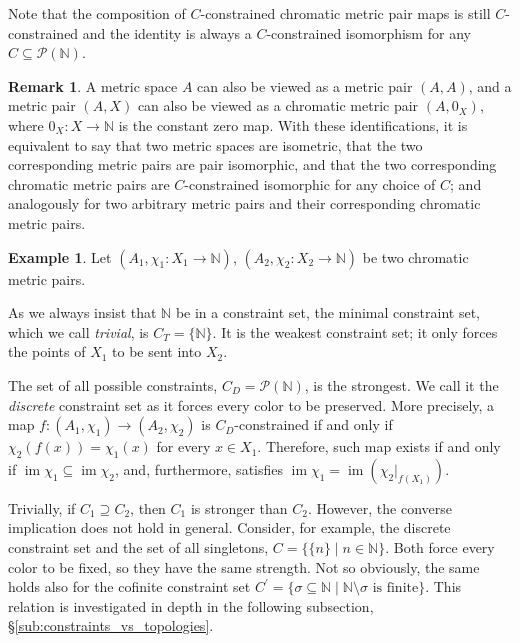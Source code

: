 \documentclass[8pt,a4paper,oneside,english,english]{article}
\theoremstyle{plain}
\theoremstyle
{plain}
\theoremstyle{definition}
\newtheorem{example}[theorem]{Example}%
\newtheorem{remark}[theorem]{Remark}%
\newcommand{\N}{\mathbb{N}}
\newcommand{\MP}[1]{(A_{#1},\chi_{#1})}
\newcommand{\extMP}[1]{(A_{#1},\chi_{#1}\colon X_{#1}\to\N)}
\DeclareMathOperator{\im}{im}
\begin{document}
Note that the composition of $C$-constrained chromatic metric pair maps is still $C$-constrained and the identity is always a $C$-constrained isomorphism for any $C\subseteq \mathcal{P}(\N)$.



\begin{remark}\label{rem:from_metric_to_chromatic_metric_pairs}
    A metric space $A$ can also be viewed as a metric pair $(A,A)$, and a metric pair $(A,X)$ can also be viewed as a chromatic metric pair $(A, 0_X)$, where $0_X\colon X\rightarrow\N$ is the constant zero map. 
    With these identifications, it is equivalent to say that two metric spaces are isometric, that the two corresponding metric pairs are pair isomorphic, and that the two corresponding chromatic metric pairs are $C$-constrained isomorphic for any choice of $C$; and analogously for two arbitrary metric pairs and their corresponding chromatic metric pairs.
\end{remark}

\begin{example}\label{ex:trivial_and_discrete_constraint_sets}
    Let $\extMP{1}$, $\extMP{2}$ be two chromatic metric pairs.
    \begin{compactenum}[(i)]
        \item As we always insist that $\N$ be in a constraint set, the minimal constraint set, which we call {\em trivial}, is $C_T=\{\N\}$. It is the weakest constraint set; it only forces the points of $X_1$ to be sent into $X_2$. 
        
        \item The set of all possible constraints, $C_D=\mathcal P(\N)$, is the strongest. We call it the {\em discrete} constraint set as it forces every color to be preserved. More precisely, a map $f\colon\MP{1}\to\MP{2}$ is $C_D$-constrained if and only if $\chi_2(f(x))=\chi_1(x)$ for every $x\in X_1$. Therefore,
        such map
        exists if and only if $\im\chi_1\subseteq\im\chi_2$,
        and, furthermore, 
        satisfies $\im\chi_1=\im(\chi_2|_{f(X_1)})$.
    \end{compactenum}
\end{example}

Trivially, if $C_1\supseteq C_2$, then $C_1$ is stronger than $C_2$. However, the converse implication does not hold in general. Consider, for example, the discrete constraint set and the set of all singletons, $C=\{\{n\}\mid n\in\N\}$. Both force every color to be fixed, so they have the same strength. 
Not so obviously, the same holds also for the cofinite constraint set $C^\prime=\{\sigma\subseteq\N\mid \N\setminus\sigma\text{ is finite}\}$. This relation is investigated in depth in the following subsection, \S\ref{sub:constraints_vs_topologies}. 
\end{document}
